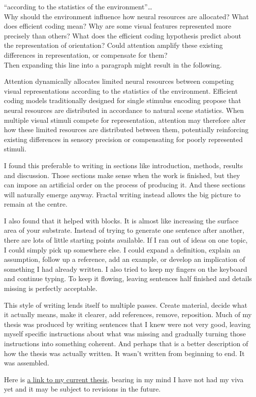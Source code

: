 \documentclass{article}
\begin{document}
``according to the statistics of the environment''\ldots
\\
Why should the environment influence how neural resources are allocated?
What does efficient coding mean?
Why are some visual features represented more precisely than others?
What does the efficient coding hypothesis predict about the representation of orientation?
Could attention amplify these existing differences in representation, or compensate for them?
\\

Then expanding this line into a paragraph might result in the following.

Attention dynamically allocates limited neural resources between competing visual representations according to the statistics of the environment. Efficient coding models traditionally designed for single stimulus encoding propose that neural resources are distributed in accordance to natural scene statistics. When multiple visual stimuli compete for representation, attention may therefore alter how these limited resources are distributed between them, potentially reinforcing existing differences in sensory precision or compensating for poorly represented stimuli.

I found this preferable to writing in sections like introduction, methods, results and discussion. Those sections make sense when the work is finished, but they can impose an artificial order on the process of producing it. And these sections will naturally emerge anyway. Fractal writing instead allows the big picture to remain at the centre. 

I also found that it helped with blocks. It is almost like increasing the surface area of your substrate. Instead of trying to generate one sentence after another, there are lots of little starting points available. If I ran out of ideas on one topic, I could simply pick up somewhere else. I could expand a definition, explain an assumption, follow up a reference, add an example, or develop an implication of something I had already written. I also tried to keep my fingers on the keyboard and continue typing. To keep it flowing, leaving sentences half finished and details missing is perfectly acceptable. 

This style of writing lends itself to multiple passes. Create material, decide what it actually means, make it clearer, add references, remove, reposition. Much of my thesis was produced by writing sentences that I knew were not very good, leaving myself specific instructions about what was missing and gradually turning those instructions into something coherent. And perhaps that is a better description of how the thesis was actually written. It wasn’t written from beginning to end. It was assembled.

Here is \href{../files/Mehta\%20Daksh\%20thesis.pdf}{a link to my current thesis}, bearing in my mind I have not had my viva yet and it may be subject to revisions in the future. 
\end{document}
